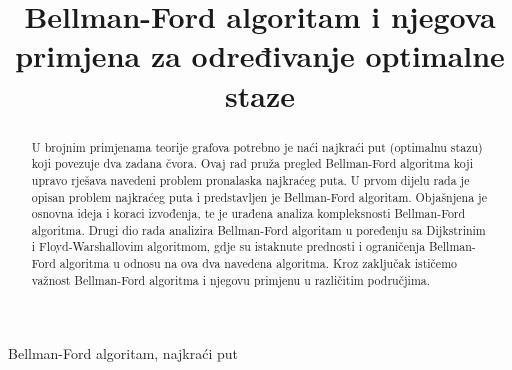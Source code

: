 \documentclass[conference]{IEEEtran}
\begin{document}
\title{Bellman-Ford algoritam i njegova primjena za određivanje optimalne staze
}

\author{
\and
{}

}

\maketitle

\begin{abstract}
U brojnim primjenama teorije grafova potrebno je naći najkraći put (optimalnu stazu) koji povezuje
dva zadana čvora. Ovaj rad pruža pregled Bellman-Ford algoritma koji upravo rješava navedeni
problem pronalaska najkraćeg puta.
U prvom dijelu rada je opisan problem najkraćeg puta i predstavljen je Bellman-Ford algoritam.
Objašnjena je osnovna ideja i koraci izvođenja, te je urađena analiza kompleksnosti Bellman-Ford
algoritma.
Drugi dio rada analizira Bellman-Ford algoritam u poređenju sa Dijkstrinim i Floyd-Warshallovim
algoritmom, gdje su istaknute prednosti i ograničenja Bellman-Ford algoritma u odnosu na ova dva
navedena algoritma.
Kroz zaključak ističemo važnost Bellman-Ford algoritma i njegovu primjenu u različitim područjima.
\end{abstract}

\renewcommand\IEEEkeywordsname{Ključni pojmovi}

\begin{IEEEkeywords}
Bellman-Ford algoritam, najkraći put
\end{IEEEkeywords}

\renewcommand\abstractname{Abstract}
\end{document}
